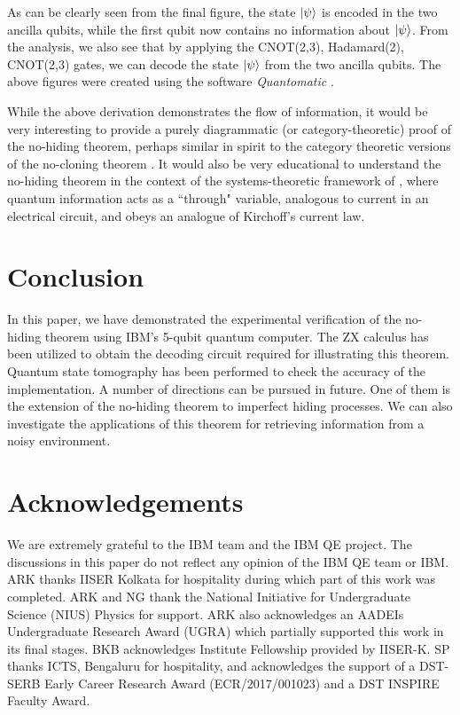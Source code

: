 As can be clearly seen from the final figure, the state $\ket{\psi}$ is encoded in the two ancilla qubits, while the first qubit now contains no information about $\ket{\psi}$. From the analysis, we also see that by applying the CNOT(2,3), Hadamard(2), CNOT(2,3) gates, we can decode the state $\ket{\psi}$ from the two ancilla qubits. The above figures were created using the software \textit{Quantomatic} \cite{qnoh_Kissinger2015}.

While the above derivation demonstrates the flow of information, it would be very interesting to provide a purely diagrammatic (or category-theoretic) proof of the no-hiding theorem, perhaps similar in spirit to the category theoretic versions of the no-cloning theorem \cite{qnoh_abramsky2010no}. It would also be very educational to understand the no-hiding theorem in the context of the systems-theoretic framework of \cite{qnoh_srivastava2011graph}, where quantum information acts as a ``through" variable, analogous to current in an electrical circuit, and obeys an analogue of Kirchoff's current law.

\section{Conclusion}
In this paper, we have demonstrated the experimental verification of the no-hiding theorem using IBM's 5-qubit quantum computer. The ZX calculus has been utilized to obtain the decoding circuit required for illustrating this theorem. Quantum state tomography has been performed to check the accuracy of the implementation. A number of directions can be pursued in future. One of them is the extension of the no-hiding theorem to imperfect hiding processes. We can also investigate the applications of this theorem for retrieving information from a noisy environment.    

\section*{Acknowledgements}
We are extremely grateful to the IBM team and the IBM QE project. The discussions in this paper do not reflect any opinion of the IBM QE team or IBM. ARK thanks IISER Kolkata for hospitality during which part of this work was completed. ARK and NG thank the National Initiative for Undergraduate Science (NIUS) Physics for support. ARK also acknowledges an AADEIs Undergraduate Research Award (UGRA) which partially supported this work in its final stages. BKB acknowledges Institute Fellowship provided by IISER-K. SP thanks ICTS, Bengaluru for hospitality, and acknowledges the support of a DST-SERB Early Career Research
Award (ECR/2017/001023) and a DST INSPIRE Faculty Award.

